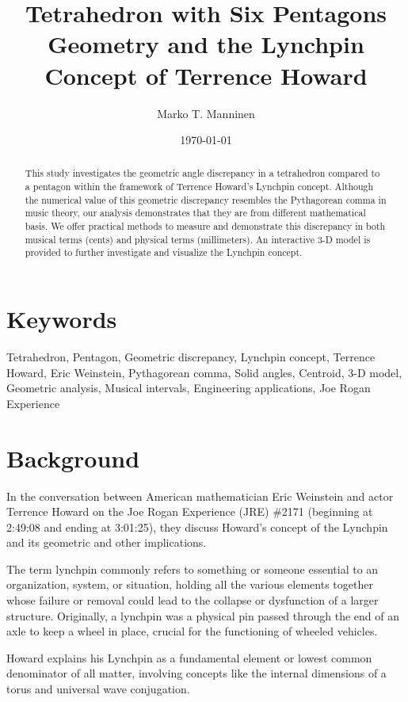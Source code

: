 \documentclass[a4paper,12pt]{article}
\title{Tetrahedron with Six Pentagons Geometry and the Lynchpin Concept of Terrence Howard}
\author{Marko T. Manninen}
\date{\today}
\begin{document}
\maketitle

\begin{abstract}
\noindent
This study investigates the geometric angle discrepancy in a tetrahedron compared to a pentagon within the framework of Terrence Howard's Lynchpin concept. Although the numerical value of this geometric discrepancy resembles the Pythagorean comma in music theory, our analysis demonstrates that they are from different mathematical basis. We offer practical methods to measure and demonstrate this discrepancy in both musical terms (cents) and physical terms (millimeters). An interactive 3-D model is provided to further investigate and visualize the Lynchpin concept.
\end{abstract}

\section*{Keywords}
Tetrahedron, Pentagon, Geometric discrepancy, Lynchpin concept, Terrence Howard, Eric Weinstein, Pythagorean comma, Solid angles, Centroid, 3-D model, Geometric analysis, Musical intervals, Engineering applications, Joe Rogan Experience

\thispagestyle{empty}

\onehalfspacing

\pagestyle{fancy}
\fancyhf{}
\fancyhead[C]{\thepage}


\section{Background}
In the conversation between American mathematician Eric Weinstein and actor Terrence Howard on the Joe Rogan Experience (JRE) \#2171 (beginning at 2:49:08 and ending at 3:01:25), they discuss Howard's concept of the Lynchpin and its geometric and other implications.

The term lynchpin commonly refers to something or someone essential to an organization, system, or situation, holding all the various elements together whose failure or removal could lead to the collapse or dysfunction of a larger structure. Originally, a lynchpin was a physical pin passed through the end of an axle to keep a wheel in place, crucial for the functioning of wheeled vehicles.

Howard explains his Lynchpin as a fundamental element or lowest common denominator of all matter, involving concepts like the internal dimensions of a torus and universal wave conjugation.
\end{document}
